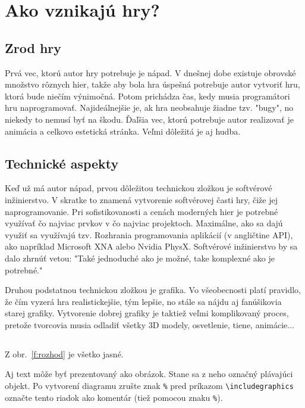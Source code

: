 \documentclass[10pt,twoside,slovak,a4paper]{article}
\begin{document}
\section{Ako vznikajú hry?} \label{pocitacove}

\subsection{Zrod hry}

Prvá vec, ktorú autor hry potrebuje je nápad. V dnešnej dobe existuje obrovské množstvo rôznych hier, takže aby bola hra úspešná potrebuje autor vytvoriť hru, ktorá bude niečím výnimočná. Potom prichádza čas, kedy musia programátori hru naprogramovať. Najideálnejšie je, ak hra neobsahuje žiadne tzv. "bugy", no niekedy to nemusí byť na škodu. Ďaľšia vec, ktorú potrebuje autor realizovať je animácia a celkovo estetická stránka. Veľmi dôležitá je aj hudba.

\subsection{Technické aspekty}

Keď už má autor nápad, prvou dôležitou technickou zložkou je softvérové inžinierstvo. V skratke to znamená vytvorenie softvérovej časti hry, čiže jej naprogramovanie. Pri sofistikovanosti a cenách moderných hier je potrebné využívať čo najviac prvkov v čo najviac projektoch. Maximálne, ako sa dajú využiť sa využívajú tzv. Rozhrania programovania aplikácií (v angličtine API), ako napríklad Microsoft XNA alebo Nvidia PhysX. Softvérové inžinierstvo by sa dalo zhrnúť vetou: "Také jednoduché ako je možné, take komplexné ako je potrebné."

Druhou podstatnou technickou zložkou je grafika. Vo všeobecnosti platí pravidlo, že čím vyzerá hra realistickejšie, tým lepšie, no stále sa nájdu aj fanúšikovia starej grafiky. Vytvorenie dobrej grafiky je taktiež veľmi komplikovaný proces, pretože tvorcovia musia odladiť všetky 3D modely, osvetlenie, tiene, animácie... 

\subsection{}

Z obr.~\ref{f:rozhod} je všetko jasné. 

\begin{figure*}[tbh]
\centering
Aj text môže byť prezentovaný ako obrázok. Stane sa z neho označný plávajúci objekt. Po vytvorení diagramu zrušte znak \texttt{\%} pred príkazom \verb|\includegraphics| označte tento riadok ako komentár (tiež pomocou znaku \texttt{\%}).
\caption{Rozhodujúci argument.}
\label{f:rozhod}
\end{figure*}
\end{document}
